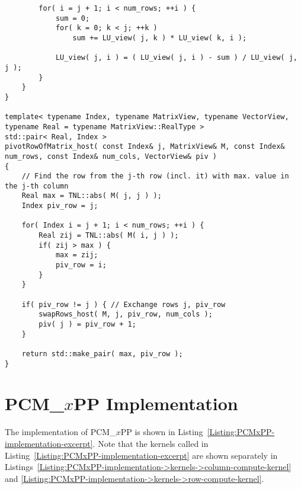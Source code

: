 \begin{lstlisting}
		for( i = j + 1; i < num_rows; ++i ) {
			sum = 0;
			for( k = 0; k < j; ++k )
				sum += LU_view( j, k ) * LU_view( k, i );
			
			LU_view( j, i ) = ( LU_view( j, i ) - sum ) / LU_view( j, j );
		}
	}
}

template< typename Index, typename MatrixView, typename VectorView, typename Real = typename MatrixView::RealType >
std::pair< Real, Index >
pivotRowOfMatrix_host( const Index& j, MatrixView& M, const Index& num_rows, const Index& num_cols, VectorView& piv )
{
	// Find the row from the j-th row (incl. it) with max. value in the j-th column
	Real max = TNL::abs( M( j, j ) );
	Index piv_row = j;
	
	for( Index i = j + 1; i < num_rows; ++i ) {
		Real zij = TNL::abs( M( i, j ) );
		if( zij > max ) {
			max = zij;
			piv_row = i;
		}
	}
	
	if( piv_row != j ) { // Exchange rows j, piv_row
		swapRows_host( M, j, piv_row, num_cols );
		piv( j ) = piv_row + 1;
	}
	
	return std::make_pair( max, piv_row );
}
\end{lstlisting}





\chapter{PCM\_$x$PP Implementation}\label{Appendix:PCMxPP-implementation}
The implementation of PCM\_$x$PP is shown in Listing~\ref{Listing:PCMxPP-implementation-excerpt}.
Note that the kernels called in Listing~\ref{Listing:PCMxPP-implementation-excerpt} are shown separately in Listings~\ref{Listing:PCMxPP-implementation->kernels->column-compute-kernel} and \ref{Listing:PCMxPP-implementation->kernels->row-compute-kernel}.

